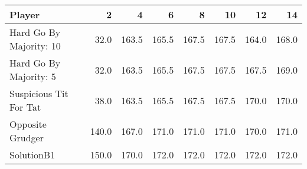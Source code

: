 \begin{tabular}{lrrrrrrr}
\toprule
                  Player &      2 &      4 &      6 &      8 &     10 &     12 &     14 \\
\midrule
 Hard Go By Majority: 10 &   32.0 &  163.5 &  165.5 &  167.5 &  167.5 &  164.0 &  168.0 \\
  Hard Go By Majority: 5 &   32.0 &  163.5 &  165.5 &  167.5 &  167.5 &  167.5 &  169.0 \\
  Suspicious Tit For Tat &   38.0 &  163.5 &  165.5 &  167.5 &  167.5 &  170.0 &  170.0 \\
        Opposite Grudger &  140.0 &  167.0 &  171.0 &  171.0 &  171.0 &  170.0 &  171.0 \\
              SolutionB1 &  150.0 &  170.0 &  172.0 &  172.0 &  172.0 &  172.0 &  172.0 \\
\bottomrule
\end{tabular}
